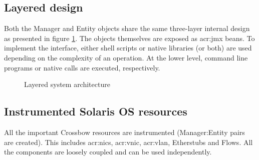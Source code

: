 \documentclass[11pt]{book}
\begin{document}
      \subsection{Layered design}

        Both the Manager and Entity objects share the same three-layer internal design as presented in figure
        \ref{fig:arch:laydes}. The objects themselves are exposed as \gls{acr:jmx} beans. To implement the interface,
        either shell scripts or native libraries (or both) are used depending on the complexity of an operation. At the
        lower level, command line programs or native calls are executed, respectively.

        \begin{figure}[H]
          \begin{center}
          \end{center}

          \caption{Layered system architecture}
          \label{fig:arch:laydes}
        \end{figure}


      \subsection{Instrumented Solaris OS resources}

        All the important Crossbow resources are instrumented (Manager:Entity pairs are created). This includes
        \gls{acr:nic}s, \gls{acr:vnic}, \gls{acr:vlan}, Etherstubs and Flows. All the components are loosely coupled and
        can be used independently.
\end{document}
